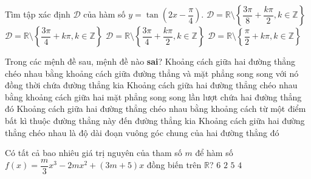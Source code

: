 \begin{ex}%
Tìm tập xác định $\mathscr{D}$ của hàm số $y=\tan\left( 2x-\dfrac{\pi}{4} \right)$.
\choice
{\True $\mathscr{D}=\mathbb{R} \setminus \left\{ \dfrac{3\pi}{8}+ \dfrac{k\pi}{2}, k\in \mathbb{Z} \right\}$}
{$\mathscr{D}=\mathbb{R} \setminus \left\{ \dfrac{3\pi}{4}+k\pi, k\in \mathbb{Z} \right\}$}
{$\mathscr{D}=\mathbb{R} \setminus \left\{ \dfrac{3\pi}{4}+ \dfrac{k\pi}{2}, k\in \mathbb{Z} \right\}$}
{$\mathscr{D}=\mathbb{R} \setminus \left\{ \dfrac{\pi}{2}+k\pi, k\in \mathbb{Z} \right\}$}
\end{ex}

\begin{ex}%
Trong các mệnh đề sau, mệnh đề nào \textbf{sai}?
\choice
{Khoảng cách giữa hai đường thẳng chéo nhau bằng khoảng cách giữa đường thẳng và mặt phẳng song song với nó đồng thời chứa đường thẳng kia}
{Khoảng cách giữa hai đường thẳng chéo nhau bằng khoảng cách giữa hai mặt phẳng song song lần lượt chứa hai đường thẳng đó}
{\True Khoảng cách giữa hai đường thẳng chéo nhau bằng khoảng cách từ một điểm bất kì thuộc đường thẳng này đến đường thẳng kia}
{Khoảng cách giữa hai đường thẳng chéo nhau là độ dài đoạn vuông góc chung của hai đường thẳng đó}
\end{ex}

\begin{ex}%
Có tất cả bao nhiêu giá trị nguyên của tham số $m$ để hàm số $f(x)=\dfrac{m}{3}x^3 -2mx^2 +(3m+5)x$ đồng biến trên $\mathbb{R}$?
\choice
{\True $6$}
{$2$}
{$5$}
{$4$}
\end{ex}

